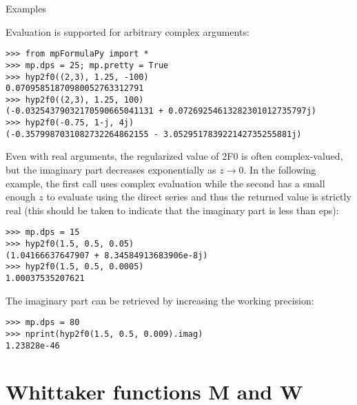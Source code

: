 Examples

Evaluation is supported for arbitrary complex arguments:

\begin{lstlisting}
>>> from mpFormulaPy import *
>>> mp.dps = 25; mp.pretty = True
>>> hyp2f0((2,3), 1.25, -100)
0.07095851870980052763312791
>>> hyp2f0((2,3), 1.25, 100)
(-0.03254379032170590665041131 + 0.07269254613282301012735797j)
>>> hyp2f0(-0.75, 1-j, 4j)
(-0.3579987031082732264862155 - 3.052951783922142735255881j)
\end{lstlisting}

Even with real arguments, the regularized value of 2F0 is often complex-valued, but the imaginary part decreases exponentially as $z \rightarrow 0$. In the following example, the first call uses complex evaluation while the second has a small enough $z$ to evaluate using the direct series and thus the returned value is strictly real (this should be taken to indicate that the imaginary part is less than eps):

\begin{lstlisting}
>>> mp.dps = 15
>>> hyp2f0(1.5, 0.5, 0.05)
(1.04166637647907 + 8.34584913683906e-8j)
>>> hyp2f0(1.5, 0.5, 0.0005)
1.00037535207621
\end{lstlisting}

The imaginary part can be retrieved by increasing the working precision:

\begin{lstlisting}
>>> mp.dps = 80
>>> nprint(hyp2f0(1.5, 0.5, 0.009).imag)
1.23828e-46
\end{lstlisting}


\newpage
\section{Whittaker functions M and W}

